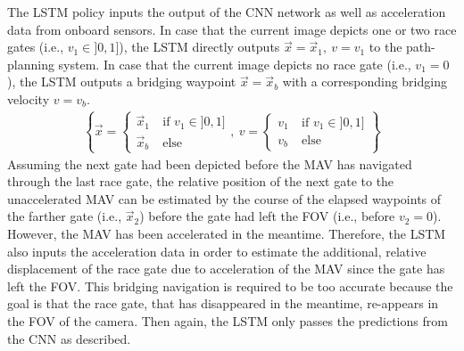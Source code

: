 The LSTM policy inputs the output of the CNN network as well as acceleration data from onboard sensors.
In case that the current image depicts one or two race gates (i.e., $v_1 \in ]0,1]$),
the LSTM directly outputs $\vec x = \vec x_1,\ v= v_1$ to the path-planning system.
In case that the current image depicts no race gate (i.e., $v_1 = 0$),
the LSTM outputs a bridging waypoint $\vec x = \vec x_b$ with a corresponding bridging velocity $v=v_b$.
\begin{align}
    \left\{
    \vec x = 
    \begin{cases}
        \vec x_1\ & \text{if }v_1 \in ]0,1] \\
        \vec x_b\ & \text{else}
    \end{cases},\ 
    v =
    \begin{cases}
        v_1\ & \text{if }v_1 \in ]0,1] \\
        v_b\ & \text{else}
    \end{cases}
    \right\}
\end{align}
Assuming the next gate had been depicted before the MAV has navigated through the last race gate,
the relative position of the next gate to the unaccelerated MAV can be estimated by the course of
the elapsed waypoints of the farther gate (i.e., $\vec x_2$) before the gate had left the FOV (i.e., before $v_2 = 0$).
However, the MAV has been accelerated in the meantime.
Therefore, the LSTM also inputs the acceleration data in order to estimate
the additional, relative displacement of the race gate due to acceleration of the MAV since the gate has left the FOV.
This bridging navigation is required to be too accurate because the goal is that the race gate, 
that has disappeared in the meantime, re-appears in the FOV of the camera.
Then again, the LSTM only passes the predictions from the CNN as described.

